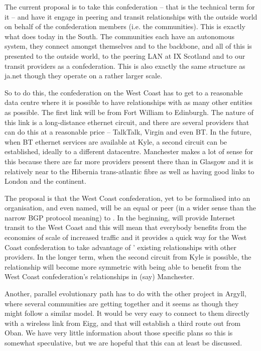 The current proposal is to take this confederation -- that is the
technical term for it -- and have it engage in peering and transit
relationships with the outside world on behalf of the confederation
members (i.e. the communities). This is exactly what \HUBS{} does
today in the South. The communities each have an autonomous system,
they connect amongst themselves and to the backbone, and all of this
is presented to the outside world, to the peering LAN at IX Scotland
and to our transit providers as a confederation. This is also exactly
the same structure as ja.net though they operate on a rather larger
scale.

So to do this, the confederation on the West Coast has to get to a
reasonable data centre where it is possible to have relationships with
as many other entities as possible. The first link will be from Fort
William to Edinburgh. The nature of this link is a long-distance
ethernet circuit, and there are several providers that can do this at
a reasonable price -- TalkTalk, Virgin and even BT. In the future,
when BT ethernet services are available at Kyle, a second circuit can
be established, ideally to a different datacentre. Manchester makes a
lot of sense for this because there are far more providers present
there than in Glasgow and it is relatively near to the Hibernia
trans-atlantic fibre as well as having good links to London and the
continent.

The proposal is that the West Coast confederation, yet to be
formalised into an organisation, and even named, will be an equal or
peer (in a wider sense than the narrow BGP protocol meaning) to
\HUBS{}. In the beginning, \HUBS{} will provide Internet transit to
the West Coast and this will mean that everybody benefits from the
economies of scale of increased traffic and it provides a quick way
for the West Coast confederation to take advantage of \HUBS{}'
existing relationships with other providers. In the longer term, when
the second circuit from Kyle is possible, the relationship will become
more symmetric with \HUBS{} being able to benefit from the West Coast
confederation's relationships in (say) Manchester.

Another, parallel evolutionary path has to do with the other project
in Argyll, where several communities are getting together and it seems
as though they might follow a similar model. It would be very easy to
connect to them directly with a wireless link from Eigg, and that will
establish a third route out from Oban. We have very little information
about those specific plans so this is somewhat speculative, but we are
hopeful that this can at least be discussed.

